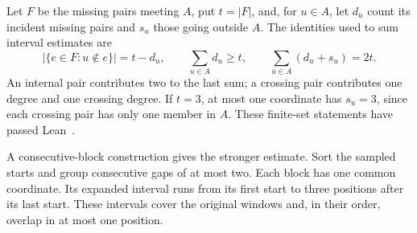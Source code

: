 \documentclass[11pt,a4paper]{article}
\theoremstyle{definition}
\theoremstyle{remark}
\begin{document}
Let $F$ be the missing pairs meeting $A$, put $t=|F|$, and, for $u\in A$,
let $d_u$ count its incident missing pairs and $s_u$ those going outside $A$.
The identities used to sum interval estimates are
\[
|\{e\in F:u\notin e\}|=t-d_u,\qquad
\sum_{u\in A}d_u\ge t,\qquad
\sum_{u\in A}(d_u+s_u)=2t.
\]
An internal pair contributes two to the last sum; a crossing pair contributes
one degree and one crossing degree. If $t=3$, at most one coordinate has
$s_u=3$, since each crossing pair has only one member in $A$. These
finite-set statements have passed Lean~\cite{occurrencearchive}.

A consecutive-block construction gives the stronger estimate. Sort the
sampled starts and group consecutive gaps of at most two. Each block has
one common coordinate. Its expanded interval runs from its first start to
three positions after its last start. These intervals cover the original
windows and, in their order, overlap in at most one position.
\end{document}
